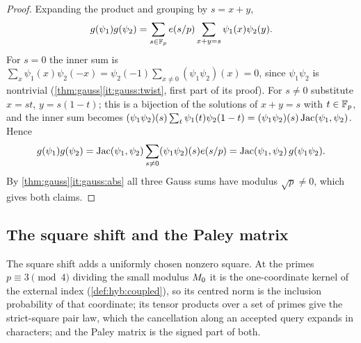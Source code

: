 \begin{proof}
Expanding the product and grouping by $s=x+y$,
\[
  g(\psi_1)g(\psi_2)=\sum_{s\in\mathbb F_p}e\!\left(s/p\right)\sum_{x+y=s}\psi_1(x)\psi_2(y).
\]
For $s=0$ the inner sum is
$\sum_x\psi_1(x)\psi_2(-x)=\psi_2(-1)\sum_{x\ne0}(\psi_1\psi_2)(x)=0$, since
$\psi_1\psi_2$ is nontrivial (\cref{thm:gauss}\ref{it:gauss:twist}, first part
of its proof). For $s\ne0$ substitute $x=st$, $y=s(1-t)$; this is a bijection
of the solutions of $x+y=s$ with $t\in\mathbb F_p$, and the inner sum becomes
$(\psi_1\psi_2)(s)\sum_t\psi_1(t)\psi_2(1-t)=(\psi_1\psi_2)(s)\operatorname{Jac}(\psi_1,\psi_2)$.
Hence
\[
 g(\psi_1)g(\psi_2)=\operatorname{Jac}(\psi_1,\psi_2)\sum_{s\ne0}(\psi_1\psi_2)(s)e\!\left(s/p\right)
 =\operatorname{Jac}(\psi_1,\psi_2)\,g(\psi_1\psi_2).
\]
By \cref{thm:gauss}\ref{it:gauss:abs} all three Gauss sums have modulus
$\sqrt p\ne0$, which gives both claims.
\end{proof}

\subsection{The square shift and the Paley matrix}\label{subsec:notation:square-shift}

The square shift adds a uniformly chosen nonzero square. At the primes $p\equiv3\pmod4$ dividing
the small modulus $M_0$ it is the one-coordinate kernel of the external index
(\cref{def:hyb:coupled}), so its centred norm is the inclusion probability of
that coordinate; its tensor products over a set of primes give the
strict-square pair law, which the
cancellation along an accepted query expands in characters; and the Paley
matrix is the signed part of both.


